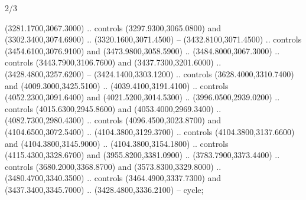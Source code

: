 \begin{flagdescription}{2/3}
\begin{scope}[shift={(0.5\flaglength,0.5)},scale=\flagwidth/130]
\begin{scope}[y=0.01mm, x=0.01mm,shift={(-3365,-2250)}]
  (3281.1700,3067.3000) .. controls (3297.9300,3065.0800) and
  (3302.3400,3074.6900) .. (3320.1600,3071.4500) -- (3432.8100,3071.4500) ..
  controls (3454.6100,3076.9100) and (3473.9800,3058.5900) ..
  (3484.8000,3067.3000) .. controls (3443.7900,3106.7600) and
  (3437.7300,3201.6000) .. (3428.4800,3257.6200) -- (3424.1400,3303.1200) ..
  controls (3628.4000,3310.7400) and (4009.3000,3425.5100) ..
  (4039.4100,3191.4100) .. controls (4052.2300,3091.6400) and
  (4021.5200,3014.5300) .. (3996.0500,2939.0200) .. controls
  (4015.6300,2945.8600) and (4053.4000,2969.3400) .. (4082.7300,2980.4300) ..
  controls (4096.4500,3023.8700) and (4104.6500,3072.5400) ..
  (4104.3800,3129.3700) .. controls (4104.3800,3137.6600) and
  (4104.3800,3145.9000) .. (4104.3800,3154.1800) .. controls
  (4115.4300,3328.6700) and (3955.8200,3381.0900) .. (3783.7900,3373.4400) ..
  controls (3680.2000,3368.8700) and (3573.8300,3329.8000) ..
  (3480.4700,3340.3500) .. controls (3464.4900,3337.7300) and
  (3437.3400,3345.7000) .. (3428.4800,3336.2100) -- cycle;


\end{scope}
\end{scope}
\end{flagdescription}
